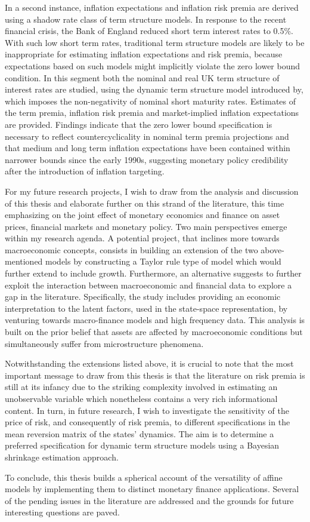 In a second instance, inflation expectations and inflation risk premia are derived using a shadow rate class of term structure models. In response to the recent financial crisis, the Bank of England reduced short term interest rates to 0.5\%. With such low short term rates, traditional term structure models are likely to be inappropriate for estimating inflation expectations and risk premia, because expectations based on such models might implicitly violate the zero lower bound condition. In this segment both the nominal and real UK term structure of interest rates are studied, using the dynamic term structure model introduced by, which imposes the non-negativity of nominal short maturity rates. Estimates of the term premia, inflation risk premia and market-implied inflation expectations are provided. Findings indicate that the zero lower bound specification is necessary to reflect countercyclicality in nominal term premia projections and that medium and long term inflation expectations have been contained within narrower bounds since the early 1990s, suggesting monetary policy credibility after the introduction of inflation targeting.

For my future research projects, I wish to draw from the analysis and discussion of this thesis and elaborate further on this strand of the literature, this time emphasizing on the joint effect of monetary economics and finance on asset prices, financial markets and monetary policy. Two main perspectives emerge within my research agenda. A potential project, that inclines more towards macroeconomic concepts, consists in building an extension of the two above-mentioned models by constructing a Taylor rule type of model which would further extend to include growth. Furthermore, an alternative suggests to further exploit the interaction between macroeconomic and financial data to explore a gap in the literature. Specifically, the study includes providing an economic interpretation to the latent factors, used in the state-space representation, by venturing towards macro-finance models and high frequency data. This analysis is built on the prior belief that assets are affected by macroeconomic conditions but simultaneously suffer from microstructure phenomena. 

Notwithstanding the extensions listed above, it is crucial to note that the most important message to draw from this thesis is that the literature on risk premia is still at its infancy due to the striking complexity involved in estimating an unobservable variable which nonetheless contains a very rich informational content. In turn, in future research, I wish to investigate the sensitivity of the price of risk, and consequently of risk premia, to different specifications in the mean reversion matrix of the states' dynamics. The aim is to determine a preferred specification for dynamic term structure models using a Bayesian shrinkage estimation approach.

To conclude, this thesis builds a spherical account of the versatility of affine models by implementing them to distinct monetary finance applications. Several of the pending issues in the literature are addressed and the grounds for future interesting questions are paved. 

